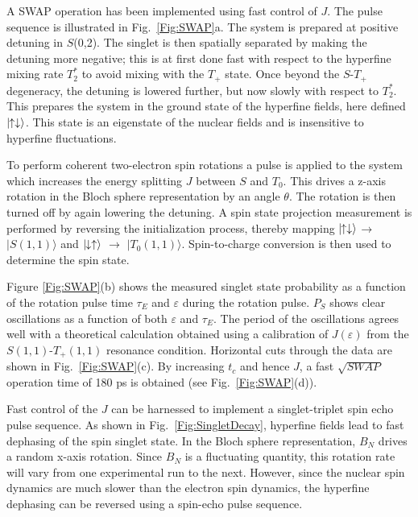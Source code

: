 \documentclass[12pt,aps,nofootinbib]{revtex4-1}
\begin{document}
A SWAP operation has been implemented using fast control of $J$. The pulse sequence is illustrated
in Fig.~\ref{Fig:SWAP}a. The system is prepared at positive
detuning in $S$(0,2). The singlet is then spatially separated by
making the detuning more negative; this is at first done fast with respect to the hyperfine mixing
rate $T_2^*$ to avoid mixing with the $T_+$ state. Once beyond the $S$-$T_+$ degeneracy, the detuning is lowered further, but now slowly with respect to $T_2^*$. This prepares the system in the ground state of the
hyperfine fields, here defined $|\!\!\uparrow\downarrow \rangle$. This
state is an eigenstate of the nuclear fields and is insensitive to
hyperfine fluctuations.

To perform coherent two-electron spin rotations a pulse is
applied to the system which increases the energy splitting $J$ between $S$ and $T_0$. This drives a z-axis rotation in the Bloch sphere representation by an angle $\theta$. The rotation is then turned off
by again lowering the detuning. A spin state projection measurement is
performed by reversing the initialization process, thereby mapping $|\!\!\uparrow\downarrow \rangle$$\rightarrow$
$|S(1,1) \rangle$ and $|\!\!\downarrow\uparrow \rangle$ $\rightarrow$
$|T_0(1,1) \rangle$. Spin-to-charge conversion is then used to
determine the spin state.

Figure \ref{Fig:SWAP}(b) shows the measured singlet state
probability as a function of the rotation pulse time $\tau_E$ and
$\varepsilon$ during the rotation pulse. $P_S$ shows clear
oscillations as a function of both $\varepsilon$ and $\tau_E$. The
period of the oscillations agrees well with a theoretical
calculation obtained using a calibration of $J(\varepsilon)$ from the
$S(1,1)$-$T_+(1,1)$ resonance condition. Horizontal cuts through
the data are shown in Fig.~\ref{Fig:SWAP}(c). By increasing
$t_c$ and hence $J$, a fast $\sqrt{SWAP}$ operation time of 180 ps
is obtained (see Fig.~\ref{Fig:SWAP}(d)).

Fast control of the $J$ can be harnessed to
implement a singlet-triplet spin echo pulse sequence. As shown in
Fig.~\ref{Fig:SingletDecay}, hyperfine fields lead to fast
dephasing of the spin singlet state. In the Bloch sphere
representation, $B_{N}$ drives a random x-axis rotation. Since
$B_{N}$ is a fluctuating quantity, this rotation rate will vary from one experimental run to the
next. However, since the nuclear spin dynamics are much slower
than the electron spin dynamics, the hyperfine dephasing can be
reversed using a spin-echo pulse sequence.
\end{document}
